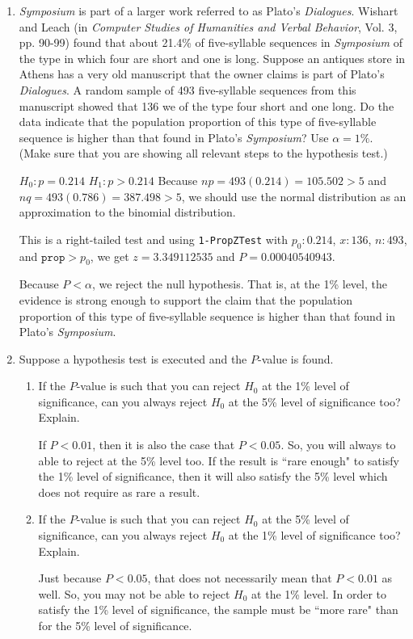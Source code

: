 \documentclass{article}
\newcommand{\answer}[1]{\color{red}#1}
\begin{document}
\begin{enumerate}
\item {\em Symposium} is part of a larger work referred to as Plato's {\em Dialogues}. Wishart and Leach (in {\em Computer Studies of Humanities and Verbal Behavior}, Vol. 3, pp. 90-99) found that about 21.4\% of five-syllable sequences in {\em Symposium} of the type in which four are short and one is long. Suppose an antiques store in Athens has a very old manuscript that the owner claims is part of Plato's {\em Dialogues}. A random sample of 493 five-syllable sequences from this manuscript showed that 136 we of the type four short and one long. Do the data indicate that the population proportion of this type of five-syllable sequence is higher than that found in Plato's {\em Symposium}? Use $\alpha = 1\%$. 
(Make sure that you are showing all relevant steps to the hypothesis test.) 

{\answer $H_0: p = 0.214$ 
$H_1: p > 0.214$ 
Because $np = 493(0.214) = 105.502 >5$ and $nq = 493(0.786)=387.498 >5$, we should use the normal distribution as an approximation to the binomial distribution. 

This is a right-tailed test and using \texttt{1-PropZTest} with $p_0: 0.214$, $x: 136$, $n: 493$, and $\texttt{prop} > p_0$, we get $z = 3.349112535$ and $P = 0.00040540943$. 

Because $P < \alpha$, we reject the null hypothesis. That is, at the 1\% level, the evidence is strong enough to support the claim that the population proportion of this type of five-syllable sequence is higher than that found in Plato's {\em Symposium}. } 
 


\item Suppose a hypothesis test is executed and the $P$-value is found. 
	\begin{enumerate}
	\item If the $P$-value is such that you can reject $H_0$ at the 1\% level of significance, can you always reject $H_0$ at the 5\% level of significance too? Explain. 
	
	{\answer If $P<0.01$, then it is also the case that $P<0.05$. So, you will always to able to reject at the 5\% level too. If the result is ``rare enough" to satisfy the 1\% level of significance, then it will also satisfy the 5\% level which does not require as rare a result.} 
	 
	
	\item If the $P$-value is such that you can reject $H_0$ at the 5\% level of significance, can you always reject $H_0$ at the 1\% level of significance too? Explain. 
	
	{\answer Just because $P < 0.05$, that does not necessarily mean that $P < 0.01$ as well. So, you may not be able to reject $H_0$ at the 1\% level. In order to satisfy the 1\% level of significance, the sample must be ``more rare" than for the 5\% level of significance.}
	 
	\end{enumerate}


\end{enumerate}
\vfill
\end{document}
